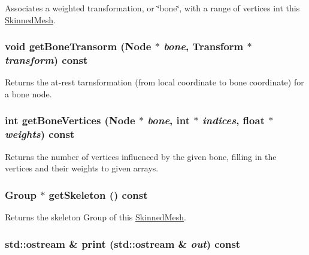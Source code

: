 Associates a weighted transformation, or \char`\"{}bone\char`\"{}, with a range of vertices int this \hyperlink{classm3g_1_1SkinnedMesh}{SkinnedMesh}. \hypertarget{classm3g_1_1SkinnedMesh_b0023a2cdce8d562a4988024e8644a13}{
\subsubsection[{getBoneTransorm}]{\setlength{\rightskip}{0pt plus 5cm}void getBoneTransorm ({\bf Node} $\ast$ {\em bone}, \/  {\bf Transform} $\ast$ {\em transform}) const}}
\label{classm3g_1_1SkinnedMesh_b0023a2cdce8d562a4988024e8644a13}


Returns the at-rest tarnsformation (from local coordinate to bone coordinate) for a bone node. \hypertarget{classm3g_1_1SkinnedMesh_e14038d004d58e797f10fbfa6a9a18d9}{
\subsubsection[{getBoneVertices}]{\setlength{\rightskip}{0pt plus 5cm}int getBoneVertices ({\bf Node} $\ast$ {\em bone}, \/  int $\ast$ {\em indices}, \/  float $\ast$ {\em weights}) const}}
\label{classm3g_1_1SkinnedMesh_e14038d004d58e797f10fbfa6a9a18d9}


Returns the number of vertices influenced by the given bone, filling in the vertices and their weights to given arrays. \hypertarget{classm3g_1_1SkinnedMesh_ce7d69c2b600f6f01a46214db28e6f92}{
\subsubsection[{getSkeleton}]{\setlength{\rightskip}{0pt plus 5cm}Group $\ast$ getSkeleton () const}}
\label{classm3g_1_1SkinnedMesh_ce7d69c2b600f6f01a46214db28e6f92}


Returns the skeleton Group of this \hyperlink{classm3g_1_1SkinnedMesh}{SkinnedMesh}. \hypertarget{classm3g_1_1SkinnedMesh_6fea17fa1532df3794f8cb39cb4f911f}{
\subsubsection[{print}]{\setlength{\rightskip}{0pt plus 5cm}std::ostream \& print (std::ostream \& {\em out}) const}}
\label{classm3g_1_1SkinnedMesh_6fea17fa1532df3794f8cb39cb4f911f}


